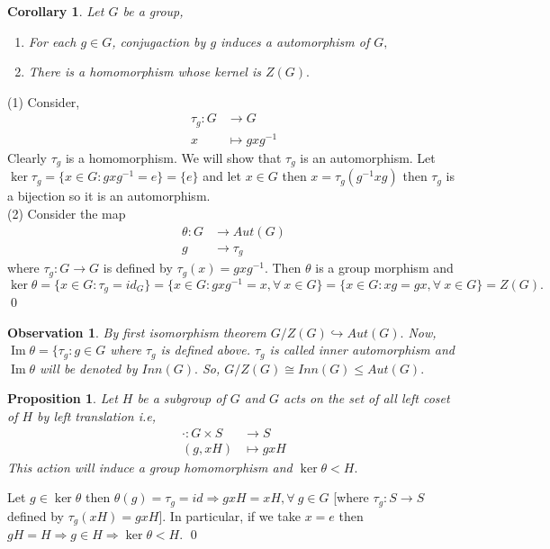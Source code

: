 \documentclass[11pt]{amsart}
\newtheorem{obs}[theorem]{Observation}
\newtheorem{prop}[theorem]{Proposition}
\newtheorem{corollary}[theorem]{Corollary}%
\DeclareMathOperator{\im}{\text{Im}}
\begin{document}
\begin{corollary}
Let $G$ be a group, \begin{enumerate}
\item For each $g\in G$, conjugaction by $g$ induces a automorphism of $G,$ 
\item There is a homomorphism whose kernel is $Z(G).$
\end{enumerate}
\end{corollary}
\proof (1) Consider, \begin{align*}
\tau_g:G&\to G\\
x&\mapsto gxg^{-1}
\end{align*}
Clearly $\tau_g$ is a homomorphism. We will show that $\tau_g$ is an automorphism. Let $\ker \tau_g=\{x\in G:gxg^{-1}=e\}=\{e\}$ and let $x\in G$ then $x=\tau_g(g^{-1}xg)$ then $\tau_g$ is a bijection so it is an automorphism.\\
(2) Consider the map \begin{align*}
\theta:G&\to Aut(G)\\
g&\to \tau_g
\end{align*}
where $\tau_g:G\to G$ is defined by $\tau_g(x)=gxg^{-1}.$
Then $\theta$ is a group morphism and $\ker \theta=\{x\in G:\tau_g=id_G\}=\{x\in G:gxg^{-1}=x,\forall~x\in G\}=\{x\in G:xg=gx,\forall~x\in G\}=Z(G).$ \qed
\begin{obs}
By first isomorphism theorem $G/Z(G)\hookrightarrow Aut(G).$ Now, $\im \theta=\{\tau_g:g\in G$ where $\tau_g$ is defined above. $\tau_g$ is called inner automorphism and $\im \theta$ will be denoted by $Inn(G).$ So, $G/Z(G)\cong Inn(G)\leq Aut(G).$
\end{obs}
\begin{prop}
Let $H$ be a subgroup of $G$ and $G$ acts on the set of all left coset of $H$ by left translation i.e, \begin{align*}
\cdot:G\times S&\to S\\
(g,xH)&\mapsto gxH
\end{align*}
This action will induce a group homomorphism and $\ker \theta<H.$
\end{prop}
\proof Let $g\in \ker \theta$ then $\theta(g)=\tau_g=id \Rightarrow gxH=xH,\forall~g\in G$ [where $\tau_g:S\to S$ defined by $\tau_g(xH)=gxH$]. In particular, if we take $x=e$ then $gH=H \Rightarrow g\in H \Rightarrow \ker \theta<H.$ \qed
 
\end{document}
